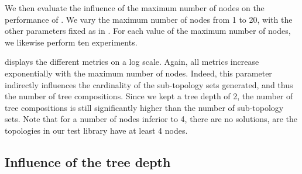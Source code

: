 We then evaluate the influence of the maximum number of nodes on the performance of \thecontrib.
We vary the maximum number of nodes from 1 to 20, with the other parameters fixed as in .
For each value of the maximum number of nodes, we likewise perform ten experiments.

 displays the different metrics on a log scale.
Again, all metrics increase exponentially with the maximum number of nodes.
Indeed, this parameter indirectly influences the cardinality of the sub-topology sets generated, and thus the number of tree compositions.
Since we kept a tree depth of 2, the number of tree compositions is still significantly higher than the number of sub-topology sets.
Note that for a number of nodes inferior to 4, there are no solutions, are the topologies in our test library have at least 4 nodes.


\subsection{Influence of the tree depth\label{subsec:topologies.benchmark.depth}}


